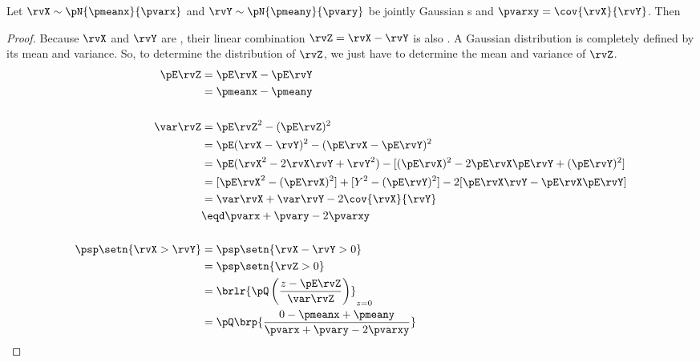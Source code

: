 \begin{proposition}
Let $\rvX\sim\pN{\pmeanx}{\pvarx}$ and $\rvY\sim\pN{\pmeany}{\pvary}$ be
jointly Gaussian s and $\pvarxy=\cov{\rvX}{\rvY}$.
Then
\propbox{
  \psp\setn{\rvX>\rvY} = \pQ\brp{\frac{-\pmeanx + \pmeany}{\pvarx+\pvary-2\pvarxy}}
  }
\end{proposition}
\begin{proof}
Because $\rvX$ and $\rvY$ are ,
their linear combination $\rvZ=\rvX-\rvY$ is also .
A Gaussian distribution is completely defined by its mean and variance.
So, to determine the distribution of $\rvZ$,
we just have to determine the mean and variance of $\rvZ$.
\begin{align*}
  \pE\rvZ
    &= \pE\rvX - \pE\rvY
  \\&= \pmeanx - \pmeany
\\
\\
  \var\rvZ
    &= \pE\rvZ^2 - (\pE\rvZ)^2
  \\&= \pE (\rvX-\rvY)^2 - (\pE\rvX - \pE\rvY)^2
  \\&= \pE (\rvX^2-2\rvX\rvY+\rvY^2) - [(\pE\rvX)^2 -2\pE\rvX \pE\rvY + (\pE\rvY)^2 ]
  \\&= [\pE\rvX^2- (\pE\rvX)^2]  + [Y^2- (\pE\rvY)^2] - 2[\pE\rvX\rvY - \pE\rvX \pE\rvY]
  \\&= \var\rvX + \var\rvY - 2\cov{\rvX}{\rvY}
  \\&\eqd \pvarx + \pvary -2\pvarxy
\\
\\
  \psp\setn{\rvX>\rvY}
    &= \psp\setn{\rvX-\rvY>0}
  \\&= \psp\setn{\rvZ>0}
  \\&= \brlr{\pQ\left(\frac{z-\pE\rvZ}{\var\rvZ} \right)}_{z=0}
  \\&= \pQ\brp{\frac{0-\pmeanx+\pmeany}{\pvarx+\pvary-2\pvarxy}}
\end{align*}
\end{proof}
